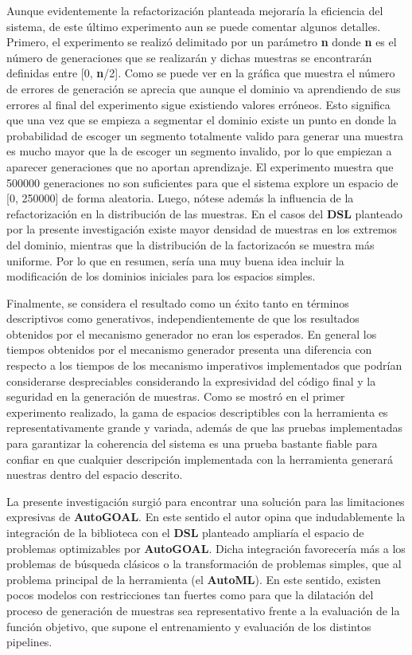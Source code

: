 Aunque evidentemente la refactorización planteada mejoraría la eficiencia del sistema, de este último experimento aun se puede
comentar algunos detalles. Primero, el experimento se realizó delimitado por un parámetro {\bf n} donde {\bf n} es el número de generaciones
que se realizarán y dichas muestras se encontrarán definidas entre [0, {\bf n}/2]. Como se puede ver en la gráfica que muestra el
número de errores de generación se aprecia que aunque el dominio va aprendiendo de sus errores al final del experimento sigue
existiendo valores erróneos. Esto significa que una vez que se empieza a segmentar el dominio existe un punto en donde la
probabilidad de escoger un segmento totalmente valido para generar una muestra es mucho mayor que la de escoger un segmento
invalido, por lo que empiezan a aparecer generaciones que no aportan aprendizaje. El experimento muestra que 500000
generaciones no son suficientes para que el sistema explore un espacio de [0, 250000] de forma aleatoria.
Luego, nótese además la influencia de la refactorización en la distribución de las muestras. En el casos del {\bf DSL} planteado
por la presente investigación existe mayor densidad de muestras en los extremos del dominio, mientras que la distribución
de la factorizacón se muestra más uniforme. Por lo que en resumen, sería una muy buena idea incluir la modificación de los
dominios iniciales para los espacios simples.

Finalmente, se considera el resultado como un éxito tanto en términos descriptivos como generativos, independientemente
de que los resultados obtenidos por el mecanismo generador no eran los esperados. En general los tiempos obtenidos por el
mecanismo generador presenta una diferencia con respecto a los tiempos de los mecanismo imperativos implementados que podrían
considerarse despreciables considerando la expresividad del código final y la seguridad en la generación de muestras. Como se
mostró en el primer experimento realizado, la gama de espacios descriptibles con la herramienta es representativamente grande y
variada, además de que las pruebas implementadas para garantizar la coherencia del sistema es una prueba bastante fiable para
confiar en que cualquier descripción implementada con la herramienta generará nuestras dentro del espacio descrito.

La presente investigación surgió para encontrar una solución para las limitaciones expresivas de {\bf AutoGOAL}. En este
sentido el autor opina que indudablemente la integración de la biblioteca con el {\bf DSL} planteado ampliaría el espacio de problemas
optimizables por {\bf AutoGOAL}. Dicha integración favorecería más a los problemas de búsqueda clásicos o la
transformación de problemas simples, que al problema principal de la herramienta (el {\bf AutoML}). En este sentido, existen pocos modelos
con restricciones tan fuertes como para que la dilatación del proceso de generación de muestras sea representativo frente a la
evaluación de la función objetivo, que supone el entrenamiento y evaluación de los distintos pipelines.